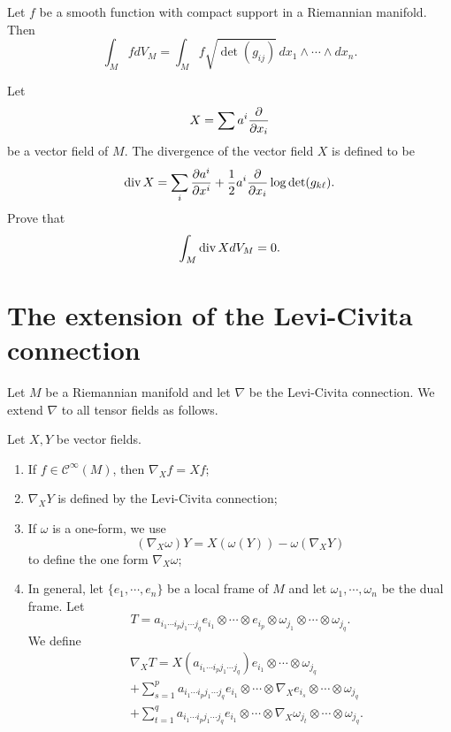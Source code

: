 \begin{definition} Let $f$ be a smooth function with compact support in a Riemannian manifold. Then
\[
\int_M fdV_M=\int_M f\sqrt{\det(g_{ij})} \,dx_1\wedge\cdots\wedge dx_n.
\]
\end{definition}

\begin{ex} Let
\[
X=\sum a^i\frac{\partial}{\partial x_i}
\]
be a vector field of $M$.
The divergence of the vector field $X$ is defined to be
\[
{\rm div}\, X=\sum_i\frac{\partial a^i}{\partial x^i}+\frac 12 a^i\frac{\partial}{\partial x_i}\log\det(g_{k\ell}).
\]
Prove that
\[
\int_M{\rm div}\, X dV_M=0.
\]
\end{ex}

\section{The extension of the Levi-Civita connection}\label{LC_connection}

Let $M$ be a Riemannian manifold and let $\nabla$ be the Levi-Civita connection. We extend $\nabla$ to all tensor fields as follows.

\begin{definition} Let $X,Y$ be vector fields.
\begin{enumerate}
\item If $f\in \mathcal C^\infty(M)$, then $\nabla_X f=Xf$;
\item  $\nabla _XY$ is defined by the Levi-Civita connection;
\item If $\omega$ is a one-form, we use
\[
(\nabla_X\omega)Y=X(\omega(Y))-\omega(\nabla_XY)
\]
 to define the one form $\nabla_X\omega$;
 \item In general, let $\{e_1,\cdots,e_n\}$ be a local frame of $M$ and let $\omega_1,\cdots,\omega_n$ be the dual frame.  Let
  \[
 T=a_{i_1\cdots i_p j_1\cdots j_q}e_{i_1}\otimes\cdots \otimes e_{i_p}\otimes\omega_{j_1}\otimes\cdots\otimes \omega_{j_q}.
 \]
We define
 \begin{align*}
 &\nabla_X T=X(a_{i_1\cdots i_pj_1\cdots j_q})e_{i_1}\otimes\cdots\otimes \omega_{j_q}\\
 &+\sum_{s=1}^p a_{i_1\cdots i_pj_1\cdots j_q}e_{i_1}\otimes\cdots\otimes \nabla_X e_{i_s}\otimes \cdots\otimes \omega_{j_q}\\\
 &+\sum_{t=1}^q a_{i_1\cdots i_pj_1\cdots j_q}e_{i_1}\otimes\cdots\otimes \nabla_X \omega_{j_t}\otimes \cdots\otimes \omega_{j_q}.
 \end{align*}
 \end{enumerate}
 \end{definition}


